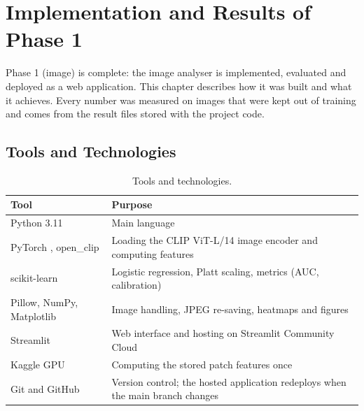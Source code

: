 \chapter{Implementation and Results of Phase 1}
Phase 1 (image) is complete: the image analyser is implemented, evaluated and deployed as a web application. This chapter describes how it was built and what it achieves. Every number was measured on images that were kept out of training and comes from the result files stored with the project code.

\section{Tools and Technologies}
\begin{table}[htbp]
\centering\small
\caption{Tools and technologies.}
\begin{tabularx}{\linewidth}{@{}p{3.6cm}X@{}}
\toprule
Tool & Purpose\\
\midrule
Python 3.11 & Main language\\
PyTorch \cite{pytorch}, open\_clip & Loading the CLIP ViT-L/14 image encoder and computing features\\
scikit-learn \cite{sklearn} & Logistic regression, Platt scaling, metrics (AUC, calibration)\\
Pillow, NumPy, Matplotlib & Image handling, JPEG re-saving, heatmaps and figures\\
Streamlit & Web interface and hosting on Streamlit Community Cloud\\
Kaggle GPU & Computing the stored patch features once\\
Git and GitHub & Version control; the hosted application redeploys when the main branch changes\\
\bottomrule
\end{tabularx}
\end{table}


